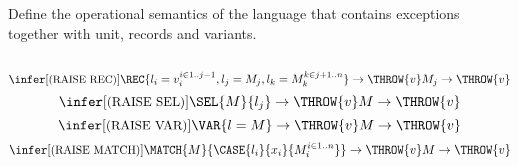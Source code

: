\subsection{}

Define the operational semantics of the language that contains exceptions together with unit,
records and variants.\\~\\
\[
	\infer[\text{\small{(RAISE REC)}}]
	{\REC{l_i=v_i^{i \in 1..j-1}, l_j = M_j, l_k = M_k^{k \in j+1..n}} \to \THROW{v}}
	{M_j \to \THROW{v}}
\]
\[
	\infer[\text{\small{(RAISE SEL)}}]
	{\SEL{M}{l_j} \to \THROW{v}}
	{M \to \THROW{v}}
\]
\[
	\infer[\text{\small{(RAISE VAR)}}]
	{\VAR{l = M} \to \THROW{v}}
	{M \to \THROW{v}}
\]
\[
	\infer[\text{\small{(RAISE MATCH)}}]
	{\MATCH{M}{\CASE{l_i}{x_i}{M_i^{i\in 1..n}}} \to \THROW{v}}
	{M \to \THROW{v}}
\]
